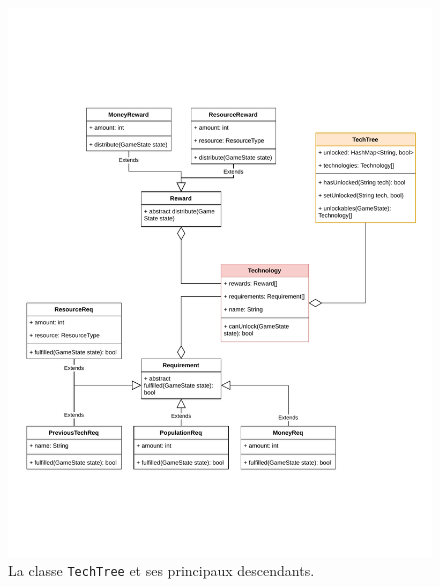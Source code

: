\documentclass[12pt]{article}
\begin{document}
\begin{figure}[H]
\includegraphics[width=\textwidth]{uml-classes-Page-5}
\caption{La classe \texttt{TechTree} et ses principaux descendants.\label{fig:techtree}}
\end{figure}
\end{document}
